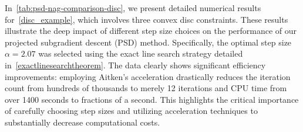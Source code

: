 \documentclass[12pt]{article}
\theoremstyle{plain}
\theoremstyle{definition}
\begin{document}
\begin{table}[H]
\begin{sideways}
	\end{sideways}
	\caption{Iteration-wise pptimal points, distances, and convergence rate for the generalized waist problem with three spehere, using Aitken acceleration}
	\label{tab:example2_Aitken_data}
\end{table}


\newpage

In~\ref{tab:psd-nag-comparison-disc}, we present detailed numerical results for~\ref{disc_example}, which involves three convex disc constraints. These results illustrate the deep impact of different step size choices on the performance of our projected subgradient descent (PSD) method. Specifically, the optimal step size \( \alpha = 2.07 \) was selected using the exact line search strategy detailed in~\ref{exactlinesearchtheorem}. The data clearly shows significant efficiency improvements: employing Aitken's acceleration  drastically reduces the iteration count from hundreds of thousands to merely 12 iterations and CPU time from over 1400 seconds to fractions of a second. This highlights the critical importance of carefully choosing step sizes and utilizing acceleration techniques to substantially decrease computational costs.
\end{document}
